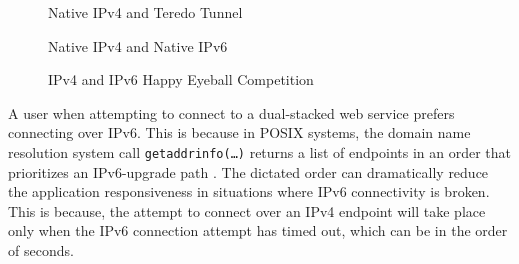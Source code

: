 \begin{figure}[t]
  \begin{minipage}[t]{0.50\textwidth}
    \centering
    \caption{Native IPv4 and Teredo Tunnel}
  \end{minipage}
  \begin{minipage}[t]{0.50\textwidth}
    \centering
    \caption{Native IPv4 and Native IPv6}
  \end{minipage}
\caption{\label{fig:happy-v4-v6-compete}IPv4 and IPv6 Happy Eyeball Competition} 
\end{figure}

A user when attempting to connect to a dual-stacked web service prefers
connecting over IPv6. This is because in POSIX systems, the domain name
resolution system call \texttt{getaddrinfo(\ldots)} returns a list of
endpoints in an order that prioritizes an IPv6-upgrade path \cite{rfc6724}.
The dictated order can dramatically reduce the application responsiveness in
situations where IPv6 connectivity is broken. This is because, the attempt to
connect over an IPv4 endpoint will take place only when the IPv6 connection
attempt has timed out, which can be in the order of seconds.

